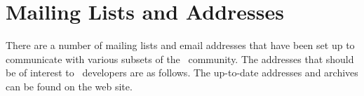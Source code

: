 
\chapter{Mailing Lists and Addresses}
\label{chap:addresses}

There are a number of mailing lists and email addresses that have been set
up to communicate with various subsets of the \cgal\ community.  The
addresses that should be of interest to \cgal\ developers are as follows.
The up-to-date addresses and archives can be found on the web site.

